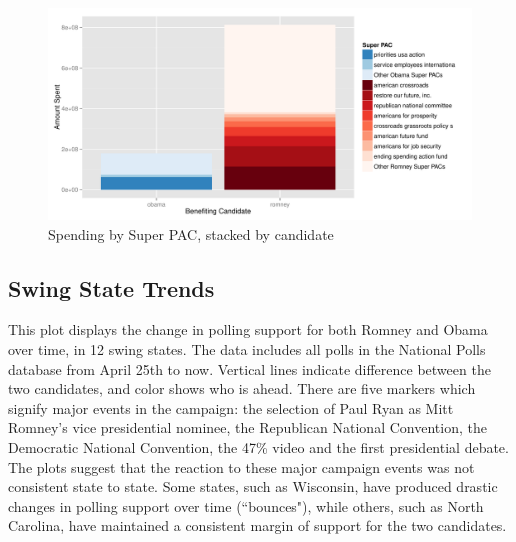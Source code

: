 \documentclass[11pt]{article}\usepackage{graphicx, color}
\newenvironment{knitrout}{}{} %
\begin{document}
\begin{knitrout}
\color{fgcolor}\begin{figure}[H]


{\centering \includegraphics[width=\textwidth]{figure/PAC_plot} 

}

\caption[Spending by Super PAC, stacked by candidate]{Spending by Super PAC, stacked by candidate\label{fig:PAC_plot}}
\end{figure}

\end{knitrout}




\subsection{Swing State Trends}

This plot displays the change in polling support for both Romney and Obama over time, in 12 swing states. The data includes all polls in the National Polls database from April 25th to now. Vertical lines indicate difference between the two candidates, and color shows who is ahead. There are five markers which signify major events in the campaign: the selection of Paul Ryan as Mitt Romney's vice presidential nominee, the Republican National Convention, the Democratic National Convention, the 47\% video and the first presidential debate. 
The plots suggest that the reaction to these major campaign events was not consistent state to state. Some states, such as Wisconsin, have produced drastic changes in polling support over time (``bounces"), while others, such as North Carolina, have maintained a consistent margin of support for the two candidates.
\end{document}
